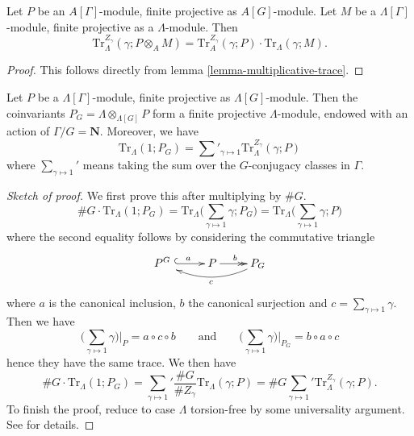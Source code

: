 \begin{lemma}
\label{lemma-weak-trace}
Let $P$ be an $A[\Gamma]$-module, finite projective as $A[G]$-module. Let $M$
be a $\Lambda[\Gamma]$-module, finite projective as a $\Lambda$-module. Then
$$
\text{Tr}_{\Lambda}^{Z_\gamma}(\gamma; P\otimes_A M) = \text{Tr}_A^{Z_\gamma}
(\gamma;P)\cdot \text{Tr}_\Lambda(\gamma; M).
$$
\end{lemma}

\begin{proof}
This follows directly from lemma \ref{lemma-multiplicative-trace}.
\end{proof}

\begin{lemma}
\label{lemma-trivial-trace}
Let $P$ be a $\Lambda[\Gamma]$-module, finite projective as
$\Lambda[G]$-module. Then the coinvariants $P_G = \Lambda\otimes_{\Lambda[G]} P$
form a finite projective $\Lambda$-module, endowed with an action of $\Gamma/G
= \mathbf{N}$. Moreover, we have
$$
\text{Tr}_\Lambda(1; P_G) =
\sum\nolimits'_{\gamma\mapsto 1}
\text{Tr}_\Lambda^{Z_\gamma}(\gamma;P)
$$
where $\sum_{\gamma\mapsto 1}'$ means taking the sum over the $G$-conjugacy
classes in $\Gamma$.
\end{lemma}

\begin{proof}[Sketch of proof]
We first prove this after multiplying by $\#G$.
$$
\# G\cdot \text{Tr}_\Lambda(1; P_G)
= \text{Tr}_\Lambda\bigg(\sum_{\gamma\mapsto 1} \gamma; P_G\bigg)
= \text{Tr}_\Lambda\bigg(\sum_{\gamma\mapsto 1} \gamma; P\bigg)
$$
where the second equality follows by considering the commutative triangle
$$
\xymatrix{
{P^G \ } \ar^a@{^(->}[r] & P \ar^b@{->>}[r] & P_G \ar^c@/^1pc/[ll]
}
$$
where $a$ is the canonical inclusion, $b$ the canonical surjection and $c =
\sum_{\gamma \mapsto 1} \gamma$. Then we have
$$
\bigg(\sum_{\gamma \mapsto 1} \gamma\bigg) \bigg|_P = a \circ c \circ b
\qquad \text{and} \qquad
\bigg(\sum_{\gamma \mapsto 1} \gamma\bigg) \bigg|_{P_G} = b \circ a \circ c
$$
hence they have the same trace. We then have
$$
\# G\cdot \text{Tr}_\Lambda(1; P_G)
=
{\sum_{\gamma\mapsto 1}}' \frac{\# G}{\# Z_\gamma}\text{Tr}_\Lambda(\gamma;P)
= \# G{\sum_{\gamma\mapsto 1}}' \text{Tr}_\Lambda^{Z_\gamma}(\gamma; P).
$$
To finish the proof, reduce to case $\Lambda$ torsion-free by some universality
argument. See \cite{SGA4.5} for details.
\end{proof}

